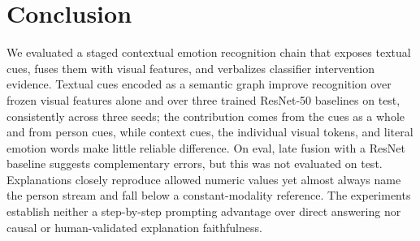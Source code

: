 \documentclass[conference]{IEEEtran}
\begin{document}
\section{Conclusion}\label{sec:conclusion}
We evaluated a staged contextual emotion recognition chain that exposes textual cues, fuses them with visual features, and verbalizes classifier intervention evidence. Textual cues encoded as a semantic graph improve recognition over frozen visual features alone and over three trained ResNet-50 baselines on test, consistently across three seeds; the contribution comes from the cues as a whole and from person cues, while context cues, the individual visual tokens, and literal emotion words make little reliable difference. On eval, late fusion with a ResNet baseline suggests complementary errors, but this was not evaluated on test. Explanations closely reproduce allowed numeric values yet almost always name the person stream and fall below a constant-modality reference. The experiments establish neither a step-by-step prompting advantage over direct answering nor causal or human-validated explanation faithfulness.



\end{document}
